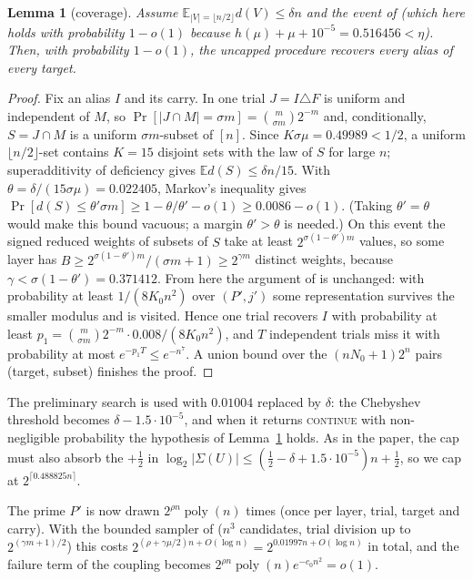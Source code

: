 \documentclass[11pt]{amsart}
\newtheorem{lemma}[theorem]{Lemma}
\theoremstyle{remark}
\newcommand{\E}{\mathbb E}
\begin{document}
\begin{lemma}[coverage]\label{lem:coverage}
Assume $\E_{|V|=\lfloor n/2\rfloor}d(V)\le\delta n$ and the event of \cite[Lemma~5.2]{oai} (which here
holds with probability $1-o(1)$ because $h(\mu)+\mu+10^{-5}=0.516456<\eta$). Then, with probability
$1-o(1)$, the uncapped procedure recovers every alias of every target.
\end{lemma}
\begin{proof}
Fix an alias $I$ and its carry. In one trial $J=I\triangle F$ is uniform and independent of $M$, so
$\Pr[|J\cap M|=\sigma m]=\binom m{\sigma m}2^{-m}$ and, conditionally, $S=J\cap M$ is a uniform
$\sigma m$-subset of $[n]$. Since $K\sigma\mu=0.49989<1/2$, a uniform $\lfloor n/2\rfloor$-set contains
$K=15$ disjoint sets with the law of $S$ for large $n$; superadditivity of deficiency
\cite[Lemma~2.2]{oai} gives $\E d(S)\le\delta n/15$. With $\theta=\delta/(15\sigma\mu)=0.022405$,
Markov's inequality gives
$\Pr[d(S)\le\theta'\sigma m]\ge1-\theta/\theta'-o(1)\ge0.0086-o(1)$.
(Taking $\theta'=\theta$ would make this bound vacuous; a margin $\theta'>\theta$ is needed.)
On this event the signed reduced weights of subsets of $S$ take at least $2^{\sigma(1-\theta')m}$
values, so some layer has $B\ge2^{\sigma(1-\theta')m}/(\sigma m+1)\ge2^{\gamma m}$ distinct weights,
because $\gamma<\sigma(1-\theta')=0.371412$. From here the argument of \cite[(5.17) and the Cauchy--Schwarz step after it]{oai} is
unchanged: with probability at least $1/(8K_0n^2)$ over $(P',j')$ some representation survives the
smaller modulus and is visited. Hence one trial recovers $I$ with probability at least
$p_1=\binom m{\sigma m}2^{-m}\cdot0.008/(8K_0n^2)$, and $T$ independent trials miss it with
probability at most $e^{-p_1T}\le e^{-n^{7}}$. A union bound over the $(nN_0+1)2^n$ pairs (target,
subset) finishes the proof.
\end{proof}

The preliminary search \cite[Proposition~2.4]{oai} is used with $0.01004$ replaced by $\delta$: the
Chebyshev threshold becomes $\delta-1.5\cdot10^{-5}$, and when it returns \textsc{continue} with
non-negligible probability the hypothesis of Lemma~\ref{lem:coverage} holds. As in the paper, the cap must also
absorb the $+\tfrac12$ in $\log_2|\Sigma(U)|\le(\tfrac12-\delta+1.5\cdot10^{-5})n+\tfrac12$, so we cap at
$2^{\lceil0.488825n\rceil}$.

The prime $P'$ is now drawn $2^{\rho n}\operatorname{poly}(n)$ times (once per layer, trial, target and
carry). With the bounded sampler of \cite[Section~6]{oai} ($n^3$ candidates, trial division up to
$2^{(\gamma m+1)/2}$) this costs $2^{(\rho+\gamma\mu/2)n+O(\log n)}=2^{0.01997n+O(\log n)}$ in total, and
the failure term of the coupling \cite[(6.4)]{oai} becomes $2^{\rho n}\operatorname{poly}(n)e^{-c_0n^2}=o(1)$.
\end{document}
